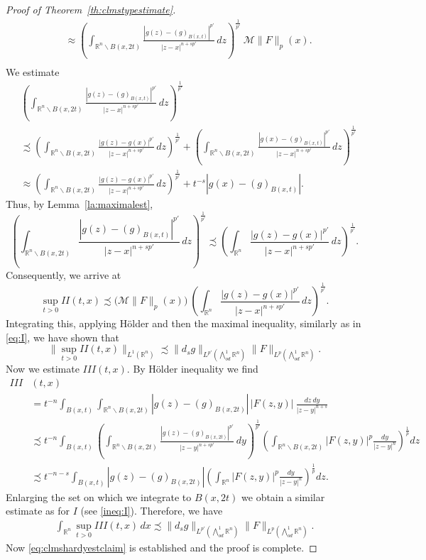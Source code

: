 \documentclass[12pt]{amsart}
\theoremstyle{definition}
\newcommand{\R}{\mathbb{R}}
\newcommand{\brac}[1]{\left (#1 \right )}
\newcommand{\Ep}{\bigwedge\nolimits}
\numberwithin{theorem}{section} \numberwithin{equation}{section}
\newcommand{\aleq}{\precsim}
\newcommand{\aeq}{\approx}
\begin{document}
\begin{proof}[Proof of Theorem~\ref{th:clmstypestimate}]
\[\begin{split}
 &\aeq  \brac{\int_{\R^n \backslash B(x,2t)} \frac{|g(z)-(g)_{B(x,t)}|^{p'}}{|z-x|^{n+sp'}}\, dz}^{\frac{1}{p'}}\  \mathcal{M} \|F\|_{p}(x).\\
\end{split}
 \]
We estimate
\[
\begin{split}
 &\brac{\int_{\R^n \backslash B(x,2t)} \frac{|g(z)-(g)_{B(x,t)}|^{p'}}{|z-x|^{n+sp'}}\, dz}^{\frac{1}{p'}}\\
 &\aleq \brac{\int_{\R^n \backslash B(x,2t)} \frac{|g(z)-g(x)|^{p'}}{|z-x|^{n+sp'}}\, dz}^{\frac{1}{p'}} + \brac{\int_{\R^n \backslash B(x,2t)} \frac{|g(x)-(g)_{B(x,t)}|^{p'}}{|z-x|^{n+sp'}}\, dz}^{\frac{1}{p'}}\\
 &\aeq \brac{\int_{\R^n \backslash B(x,2t)} \frac{|g(z)-g(x)|^{p'}}{|z-x|^{n+sp'}}\, dz}^{\frac{1}{p'}} + t^{-s} |g(x)-(g)_{B(x,t)}|.
\end{split}
 \]
Thus, by Lemma~\ref{la:maximalest},
\begin{equation}\label{eq:clmsIIest}
 \brac{\int_{\R^n \backslash B(x,2t)} \frac{|g(z)-(g)_{B(x,t)}|^{p'}}{|z-x|^{n+sp'}}\, dz}^{\frac{1}{p'}} \aleq \brac{\int_{\R^n} \frac{|g(z)-g(x)|^{p'}}{|z-x|^{n+sp'}}\, dz}^{\frac{1}{p'}}.
\end{equation}
Consequently, we arrive at
\[
 \sup_{t > 0} II(t,x) \aleq \big ( \mathcal{M} \|F\|_p(x) \big )\ \brac{\int_{\R^n} \frac{|g(z)-g(x)|^{p'}}{|z-x|^{n+sp'}}\, dz}^{\frac{1}{p'}}.
\]
Integrating this, applying H\"{o}lder and then the maximal inequality, similarly as in \eqref{eq:I}, we have shown that
\[
 \|\sup_{t > 0} II(t,x)\|_{L^1(\R^n)} \aleq \|d_s g\|_{L^{p'}(\Ep^1_{od} \R^n)}\|F\|_{L^p(\Ep^1_{od} \R^n)}.
\]
% 
Now we estimate $III(t,x)$. By H\"{o}lder inequality we find
\[
\begin{split}
 III&(t,x)\\ &= t^{-n} \int_{B(x,t)} \int_{\R^n \backslash B(x,2t)}|g(z)-(g)_{B(x,2t)}|\,  |F(z,y)|\ \frac{dz\ dy}{|z-y|^{n+s}}\\
 &\aleq  t^{-n} \int_{B(x,t)} \brac{\int_{\R^n \backslash B(x,2t)} \frac{|g(z)-(g)_{B(x,2t)}|^{p'}}{|z-y|^{n+sp'}}\, dy}^{\frac{1}{p'}}  \brac{\int_{\R^n \backslash B(x,2t)} |F(z,y)|^p\frac{dy}{|z-y|^n}}^{\frac{1}{p}} dz\\
 &\aleq  t^{-n-s} \int_{B(x,t)} |g(z)-(g)_{B(x,2t)}| \brac{\int_{\R^n} |F(z,y)|^p\frac{dy}{|z-y|^n}}^{\frac{1}{p}} dz.
\end{split}
 \]
Enlarging the set on which we integrate to $B(x,2t)$ we obtain a similar estimate as for $I$ (see \eqref{ineq:I}). Therefore, we have
\[
 \begin{split}
  \int_{\R^n}\sup_{t>0} III(t,x) \,dx \aleq \|d_s g\|_{L^{p'}(\Ep^1_{od} \R^n)}\|F\|_{L^p(\Ep^1_{od} \R^n)}.
 \end{split}
\]
Now \eqref{eq:clmshardyestclaim} is established and the proof is complete.
\end{proof}
\end{document}
